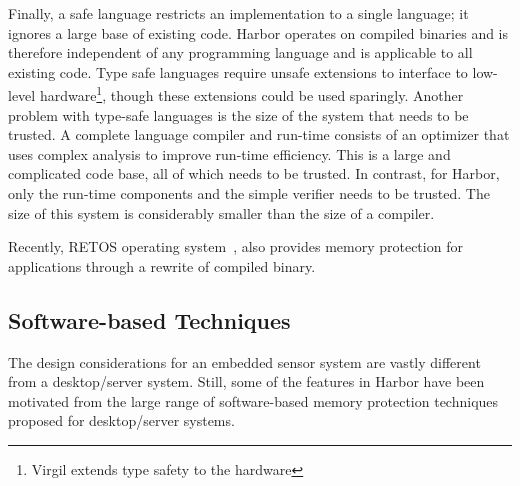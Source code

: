 Finally, a safe language restricts an implementation to a single
language; it ignores a large base of existing code.
%
Harbor operates on compiled binaries and is therefore independent of
any programming language and is applicable to all existing code.
%
Type safe languages require unsafe extensions to interface to
low-level hardware\footnote{Virgil extends type safety to the
  hardware}, though these extensions could be used sparingly.
%
Another problem with type-safe languages is the size of the system
that needs to be trusted.
%
A complete language compiler and run-time consists of an optimizer
that uses complex analysis to improve run-time efficiency.
%
This is a large and complicated code base, all of which needs to be
trusted.
%
In contrast, for Harbor, only the run-time components and the simple
verifier needs to be trusted.
%
The size of this system is considerably smaller than the size of a
compiler.
%
%
%
%
%
%

Recently, RETOS operating system~\cite{retos07spots}, also provides
memory protection for applications through a rewrite of compiled binary.

\subsection{Software-based Techniques}
%
The design considerations for an embedded sensor system are vastly
different from a desktop/server system.
%
Still, some of the features in Harbor have been motivated from the
large range of software-based memory protection techniques proposed
for desktop/server systems.
%
